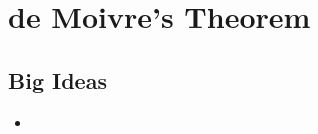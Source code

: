 \chapter{de Moivre's Theorem}
\label{chap:dMT}

\section{Big Ideas}
\label{sec:dMT Big Ideas}
\begin{itemize}
  \item 
\end{itemize}